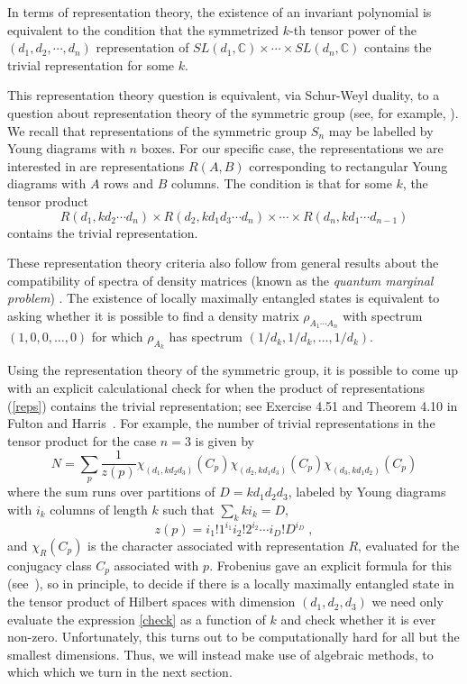 \documentclass[12pt]{article}
\theoremstyle{definition}
\newcommand{\be}{\begin{equation}}
\newcommand{\ee}{\end{equation}}
\begin{document}
In terms of representation theory, the existence of an invariant polynomial is equivalent to the condition that the symmetrized $k$-th tensor power of the $(d_1,d_2,\cdots, d_n)$ representation of $SL(d_1, \mathbb{C}) \times \cdots \times SL(d_n, \mathbb{C})$ contains the trivial representation for some $k$.

This representation theory question is equivalent, via Schur-Weyl duality, to a question about representation theory of the symmetric group (see, for example, \cite{Walter}). We recall that representations of the symmetric group $S_n$ may be labelled by Young diagrams with $n$ boxes. For our specific case, the representations we are interested in are representations $R(A,B)$ corresponding to rectangular Young diagrams with $A$ rows and $B$ columns. The condition is that for some $k$, the tensor product
\be
\label{reps}
R(d_1, k d_2 \cdots d_n) \times R(d_2, k d_1 d_3 \cdots d_n) \times \cdots \times R(d_n, k d_1 \cdots d_{n-1})
\ee
contains the trivial representation.

These representation theory criteria also follow from general results about the compatibility of spectra of density matrices (known as the {\it quantum marginal problem}) \cite{Kly04}. The existence of locally maximally entangled states is equivalent to asking whether it is possible to find a density matrix $\rho_{A_1 \cdots A_n}$ with spectrum $(1,0,0,\dots,0)$ for which $\rho_{A_k}$ has spectrum $(1/d_k,1/d_k, \dots, 1/d_k)$.

Using the representation theory of the symmetric group, it is possible to come up with an explicit calculational check for when the product of representations (\ref{reps}) contains the trivial representation; see Exercise 4.51 and Theorem 4.10 in Fulton and Harris~\cite{fh}. For example, the number of trivial representations in the tensor product for the case $n=3$ is given by
\be
\label{check}
N = \sum_p \frac{1}{z(p)} \chi_{(d_1, k d_2 d_3)}(C_p) \chi_{(d_2, k d_1 d_3)}(C_p) \chi_{(d_3, k d_1 d_2)}(C_p)
\ee
where the sum runs over partitions of $D = k d_1 d_2 d_3$, labeled by Young diagrams with $i_k$ columns of length $k$  such that $\sum_k k i_k = D$,
\be
z(p) = i_1!1^{i_1} i_2! 2^{i_2} \cdots i_D! D^{i_D} \; ,
\ee
and $\chi_R(C_p)$ is the character associated with representation $R$, evaluated for the conjugacy class $C_p$ associated with $p$. Frobenius gave an explicit formula for this (see~\cite[4.10]{fh}), so in principle, to decide if there is a locally maximally entangled state in the tensor product of Hilbert spaces with dimension $(d_1,d_2,d_3)$ we need only evaluate the expression \eqref{check} as a function of $k$ and check whether it is ever non-zero. Unfortunately, this turns out to be computationally hard for all but the smallest dimensions. Thus, we will instead make use of algebraic methods, to which which we turn in the next section.
\end{document}
